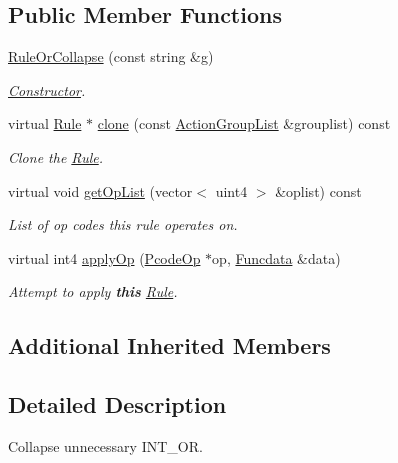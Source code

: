 \subsection*{Public Member Functions}
\begin{DoxyCompactItemize}
\item 
\mbox{\hyperlink{class_rule_or_collapse_ad245da909df1ba1f6db108103fdf2bb9}{Rule\+Or\+Collapse}} (const string \&g)
\begin{DoxyCompactList}\small\item\em \mbox{\hyperlink{class_constructor}{Constructor}}. \end{DoxyCompactList}\item 
virtual \mbox{\hyperlink{class_rule}{Rule}} $\ast$ \mbox{\hyperlink{class_rule_or_collapse_a30212e0187d8a14ebe2b8adbd396b29a}{clone}} (const \mbox{\hyperlink{class_action_group_list}{Action\+Group\+List}} \&grouplist) const
\begin{DoxyCompactList}\small\item\em Clone the \mbox{\hyperlink{class_rule}{Rule}}. \end{DoxyCompactList}\item 
virtual void \mbox{\hyperlink{class_rule_or_collapse_acfa78034c049837894b08b7ce71c2249}{get\+Op\+List}} (vector$<$ uint4 $>$ \&oplist) const
\begin{DoxyCompactList}\small\item\em List of op codes this rule operates on. \end{DoxyCompactList}\item 
virtual int4 \mbox{\hyperlink{class_rule_or_collapse_a2b43549e7241357eb9b4c22857270ba1}{apply\+Op}} (\mbox{\hyperlink{class_pcode_op}{Pcode\+Op}} $\ast$op, \mbox{\hyperlink{class_funcdata}{Funcdata}} \&data)
\begin{DoxyCompactList}\small\item\em Attempt to apply {\bfseries{this}} \mbox{\hyperlink{class_rule}{Rule}}. \end{DoxyCompactList}\end{DoxyCompactItemize}
\subsection*{Additional Inherited Members}


\subsection{Detailed Description}
Collapse unnecessary I\+N\+T\+\_\+\+OR. 

